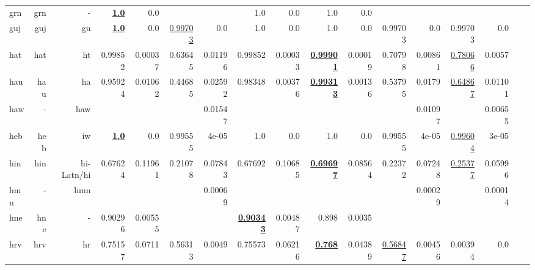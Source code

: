 \documentclass[11pt]{article}
\begin{document}
\begin{table*}[h]
{\begin{tabular}{lrrrrrrrrrrrrrrrr}
grn         & grn         & -         & \textbf{\underline{1.0}}         & 0.0         &          &          & 1.0         & 0.0         & 1.0         & 0.0         &          &          &          &          \\
guj         & guj         & gu         & \textbf{\underline{1.0}}         & 0.0         & \underline{0.99703}         & 0.0         & 1.0         & 0.0         & 1.0         & 0.0         & 0.99703         & 0.0         & 0.99703         & 0.0         \\
hat         & hat         & ht         & 0.99852         & 0.00037         & 0.63645         & 0.01196         & 0.99852         & 0.00033         & \textbf{\underline{0.99901}}         & 0.00019         & 0.70798         & 0.00861         & \underline{0.78066}         & 0.0057         \\
hau         & hau         & ha         & 0.95924         & 0.01062         & 0.44685         & 0.02592         & 0.98348         & 0.00376         & \textbf{\underline{0.99313}}         & 0.00136         & 0.53795         & 0.0179         & \underline{0.64867}         & 0.01101         \\
haw         & -         & haw         &          &          &          & 0.01547         &          &          &          &          &          & 0.01097         &          & 0.00655         \\
heb         & heb         & iw         & \textbf{\underline{1.0}}         & 0.0         & 0.99555         & 4e-05         & 1.0         & 0.0         & 1.0         & 0.0         & 0.99555         & 4e-05         & \underline{0.99604}         & 3e-05         \\
hin         & hin         & hi-Latn/hi         & 0.67624         & 0.11961         & 0.21078         & 0.07843         & 0.67692         & 0.10685         & \textbf{\underline{0.69697}}         & 0.08564         & 0.22372         & 0.07248         & \underline{0.25377}         & 0.05996         \\
hmn         & -         & hmn         &          &          &          & 0.00069         &          &          &          &          &          & 0.00029         &          & 0.00014         \\
hne         & hne         & -         & 0.90296         & 0.00555         &          &          & \textbf{\underline{0.90343}}         & 0.00487         & 0.898         & 0.0035         &          &          &          &          \\
hrv         & hrv         & hr         & 0.75157         & 0.0711         & 0.56313         & 0.0049         & 0.75573         & 0.06216         & \textbf{\underline{0.768}}         & 0.04389         & \underline{0.56847}         & 0.00456         & 0.00394         & 0.0         \\

\end{tabular}}
\end{table*}
\end{document}
